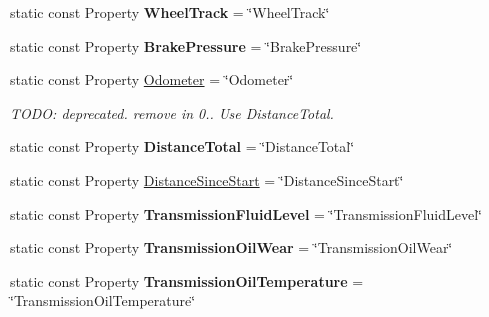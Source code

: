 \begin{DoxyCompactItemize}
\item 
\hypertarget{classVehicleProperty_a02d72875c252d2763a40b6b0eb5dbe75}{static const Property {\bfseries Wheel\+Track} = \char`\"{}Wheel\+Track\char`\"{}}\label{classVehicleProperty_a02d72875c252d2763a40b6b0eb5dbe75}

\item 
\hypertarget{classVehicleProperty_a4e7d3a126e0055cf51cac18598fdf845}{static const Property {\bfseries Brake\+Pressure} = \char`\"{}Brake\+Pressure\char`\"{}}\label{classVehicleProperty_a4e7d3a126e0055cf51cac18598fdf845}

\item 
\hypertarget{classVehicleProperty_ad97147489a5be3babe1bb94dbb2cf970}{static const Property \hyperlink{classVehicleProperty_ad97147489a5be3babe1bb94dbb2cf970}{Odometer} = \char`\"{}Odometer\char`\"{}}\label{classVehicleProperty_ad97147489a5be3babe1bb94dbb2cf970}

\begin{DoxyCompactList}\small\item\em T\+O\+D\+O\+: deprecated. remove in 0.. Use Distance\+Total. \end{DoxyCompactList}\item 
\hypertarget{classVehicleProperty_a96c023be9ac18953544b0b1445bb9cc1}{static const Property {\bfseries Distance\+Total} = \char`\"{}Distance\+Total\char`\"{}}\label{classVehicleProperty_a96c023be9ac18953544b0b1445bb9cc1}

\item 
static const Property \hyperlink{classVehicleProperty_a340253da4ce8dfac2b40f3ee27d9ed4b}{Distance\+Since\+Start} = \char`\"{}Distance\+Since\+Start\char`\"{}
\item 
\hypertarget{classVehicleProperty_a288aa5c2be698825142da9d87c13c447}{static const Property {\bfseries Transmission\+Fluid\+Level} = \char`\"{}Transmission\+Fluid\+Level\char`\"{}}\label{classVehicleProperty_a288aa5c2be698825142da9d87c13c447}

\item 
\hypertarget{classVehicleProperty_a1c0e82a127c35362f311c189d34550fb}{static const Property {\bfseries Transmission\+Oil\+Wear} = \char`\"{}Transmission\+Oil\+Wear\char`\"{}}\label{classVehicleProperty_a1c0e82a127c35362f311c189d34550fb}

\item 
\hypertarget{classVehicleProperty_acd2dc0040b1ca0548d728c98c12d05f3}{static const Property {\bfseries Transmission\+Oil\+Temperature} = \char`\"{}Transmission\+Oil\+Temperature\char`\"{}}\label{classVehicleProperty_acd2dc0040b1ca0548d728c98c12d05f3}


\end{DoxyCompactItemize}
